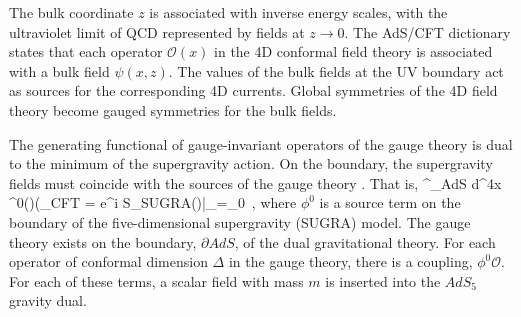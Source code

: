 The bulk coordinate $z$ is associated with inverse energy scales, with the ultraviolet limit of QCD represented by fields at $z\rightarrow0$\cite{kwee-lebed-pion}. 
The AdS/CFT dictionary \cite{maldacena,klebanov-witten} states that each operator $\mathcal{O}(x)$ in the 4D conformal field theory is associated with a bulk field $\psi(x,z)$. 
The values of the bulk fields at the UV boundary act as sources for the corresponding
4D currents. 
Global symmetries of the 4D field theory become gauged symmetries for the bulk fields. 

The generating functional of gauge-invariant operators of the gauge theory is dual to the minimum of the supergravity action. 
On the boundary, the supergravity fields must coincide with the sources of the gauge theory \cite{Gubser:1998bc,Erdmenger:2007cm}. 
That is, 
\be
{}^{\int_{\partial AdS} d^{4}x\,\phi^{0}()(}\rangle_{{\rm CFT}}  =  {\rm e}^{i S_{{\rm SUGRA}}(\phi)}|_{\phi=\phi_{0}}~,
\ee
where $\phi^{0}$ is a source term on the boundary of the five-dimensional supergravity (SUGRA) model. 
The gauge theory exists on the boundary, $\partial AdS$, of the dual gravitational theory. 
For each operator of conformal dimension $\Delta$ in the gauge theory, there is a coupling, $\phi^{0}\mathcal{O}$. 
For each of these terms, a scalar field with mass $m$ is inserted into the $AdS_{5}$ gravity dual. 

